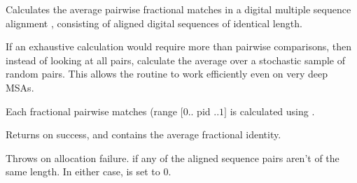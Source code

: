 \begin{sreapi}
Calculates the average pairwise fractional matches in
a digital multiple sequence alignment , consisting of 
aligned digital sequences of identical length.

If an exhaustive calculation would require more than
 pairwise comparisons, then instead of
looking at all pairs, calculate the average over a
stochastic sample of  random pairs.
This allows the routine to work efficiently even on very
deep MSAs.

Each fractional pairwise matches (range $[0..$ pid $..1]$
is calculated using .

Returns  on success, and  contains the average
fractional identity.

Throws  on allocation failure.
 if any of the aligned sequence pairs aren't 
of the same length.
In either case,  is set to 0.


\end{sreapi}


